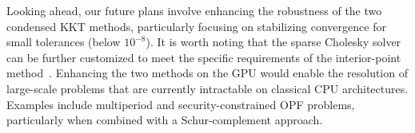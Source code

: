 \documentclass[smallextended]{svjour3}
\begin{document}
Looking ahead, our future plans involve enhancing the robustness of the two condensed KKT methods, particularly focusing on stabilizing convergence for small tolerances (below $10^{-8}$).
It is worth noting that the sparse Cholesky solver can be further customized to meet the specific requirements of the interior-point method~\cite{wright1999modified}.
Enhancing the two methods on the GPU would enable the resolution of large-scale problems that are currently intractable on classical CPU architectures.
Examples include multiperiod and security-constrained OPF problems, particularly when combined with a Schur-complement approach.

\small


\normalsize
\end{document}
